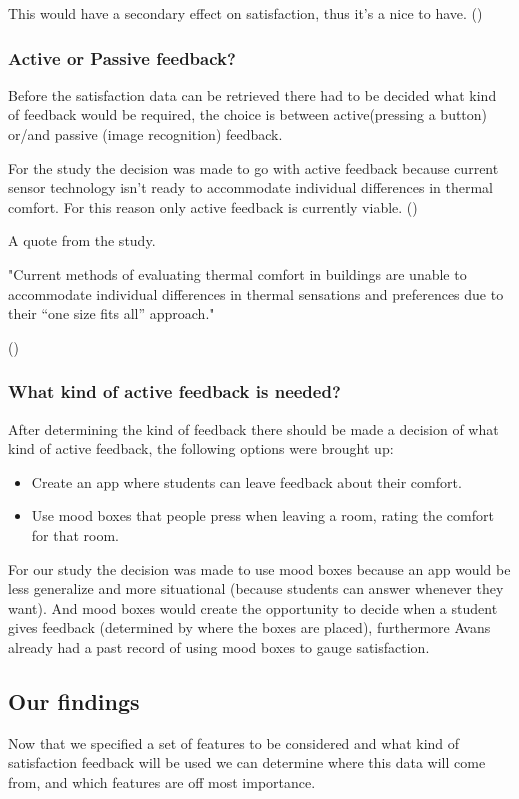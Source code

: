 \documentclass[12pt,a4paper]{article}
\begin{document}
This would have a secondary effect on satisfaction, thus it's a nice to have. 
(\cite{9foundations})

\subsubsection{Active or Passive feedback?}
Before the satisfaction data can be retrieved there had to be decided what kind of feedback would be required, the choice is between active(pressing a button) or/and passive (image recognition) feedback.

For the study the decision was made to go with active feedback because current sensor technology isn't ready to accommodate individual differences in thermal comfort. For this reason only active feedback is currently viable.
(\cite{active_passive_research})	

A quote from the study.
\begin{displayquote}
	"Current methods of evaluating thermal comfort in buildings are unable to accommodate individual 
	differences in thermal sensations and preferences due to their “one size fits all” approach."
\end{displayquote}
(\cite{active_passive_research})

\subsubsection{What kind of active feedback is needed?}
After determining the kind of feedback there should be made a decision of what kind of active feedback, the following options were brought up:
\begin{itemize}
	\item Create an app where students can leave feedback about their comfort.
	\item Use mood boxes that people press when leaving a room, rating the comfort for that room.
\end{itemize}

For our study the decision was made to use mood boxes because an app would be less generalize and more situational (because students can answer whenever they want).
And mood boxes would create the opportunity to decide when a student gives feedback (determined by where the boxes are placed), furthermore Avans already had a past record of using mood boxes to gauge satisfaction.

\subsection{Our findings}
Now that we specified a set of features to be considered and what kind of satisfaction feedback will be used we can determine where this data will come from, and which features are off most importance. 
\end{document}
